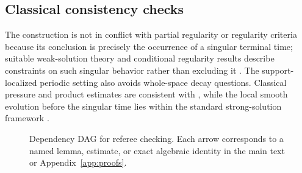 \documentclass[11pt]{article}
\numberwithin{equation}{section}
\begin{document}
\subsection{Classical consistency checks}
The construction is not in conflict with partial regularity or regularity criteria because its conclusion is precisely the occurrence of a singular terminal time; suitable weak-solution theory and conditional regularity results describe constraints on such singular behavior rather than excluding it \cite{CKN1982,EscauriazaSereginSverak2003,Serrin1962}.  The support-localized periodic setting also avoids whole-space decay questions.  Classical pressure and product estimates are consistent with \cite{Stein1970,KatoPonce1988}, while the local smooth evolution before the singular time lies within the standard strong-solution framework \cite{FujitaKato1964,Kato1984,MajdaBertozzi2002,LemarieRieusset2002}.

\begin{figure}[ht]
\centering
{}
\caption{Dependency DAG for referee checking.  Each arrow corresponds to a named lemma, estimate, or exact algebraic identity in the main text or Appendix~\ref{app:proofs}.}
\label{fig:dependency}
\end{figure}
\end{document}

